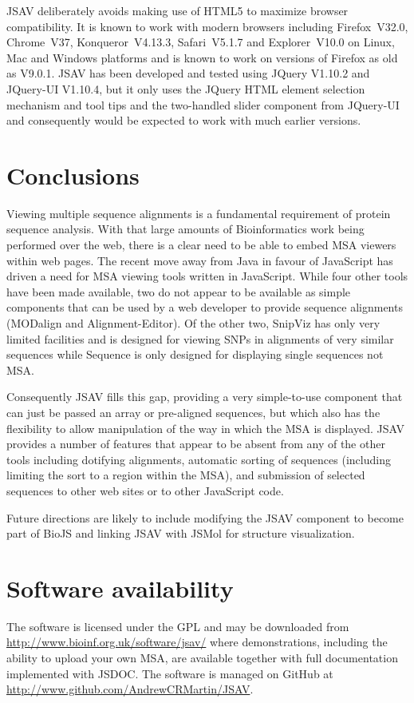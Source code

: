 \documentclass[10pt,a4paper,twocolumn]{article}
\begin{document}
JSAV deliberately avoids making use of HTML5 to maximize browser
compatibility. It is known to work with modern browsers including
Firefox~V32.0, Chrome~V37, Konqueror~V4.13.3, Safari~V5.1.7 and
Explorer~V10.0 on Linux, Mac and Windows platforms and is known to
work on versions of Firefox as old as V9.0.1. JSAV has been developed
and tested using JQuery V1.10.2 and JQuery-UI V1.10.4, but it only
uses the JQuery HTML element selection mechanism and tool tips and the
two-handled slider component from JQuery-UI and consequently would be
expected to work with much earlier versions.

\section*{Conclusions}
Viewing multiple sequence alignments is a fundamental requirement of
protein sequence analysis. With that large amounts of Bioinformatics
work being performed over the web, there is a clear need to be able to
embed MSA viewers within web pages. The recent move away from Java in
favour of JavaScript has driven a need for MSA viewing tools written
in JavaScript. While four other tools have been made available, two do
not appear to be available as simple components that can be used by a
web developer to provide sequence alignments (MODalign and
Alignment-Editor). Of the other two, SnipViz has only very limited
facilities and is designed for viewing SNPs in alignments of very
similar sequences while Sequence is only designed for displaying single
sequences not MSA.

Consequently JSAV fills this gap, providing a very simple-to-use
component that can just be passed an array or pre-aligned sequences,
but which also has the flexibility to allow manipulation of the way in
which the MSA is displayed. JSAV provides a number of features that
appear to be absent from any of the other tools including dotifying
alignments, automatic sorting of sequences (including limiting the
sort to a region within the MSA), and submission of selected sequences
to other web sites or to other JavaScript code.

Future directions are likely to include modifying the JSAV component
to become part of BioJS\cite{corpas:biojs} and linking JSAV with JSMol
for structure visualization.


\section*{Software availability}
The software is licensed under the GPL and may be downloaded from
\url{http://www.bioinf.org.uk/software/jsav/} where demonstrations,
including the ability to upload your own MSA, are available together
with full documentation implemented with JSDOC. The software is managed on GitHub at \url{http://www.github.com/AndrewCRMartin/JSAV}.
\end{document}
